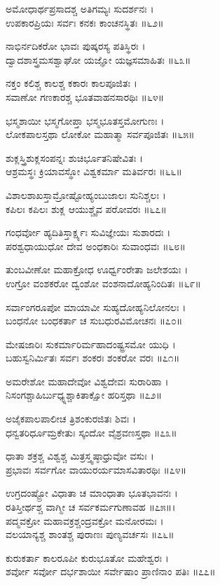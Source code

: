 ಅಮೋಧಾರ್ಥಪ್ರಸಾದಶ್ಚ ಅತಿಗಮ್ಯಃ ಸುದರ್ಶನಃ ।\\
ಉಪಕಾರಪ್ರಿಯಃ ಸರ್ವಃ ಕನಕಃ ಕಾಂಚನಸ್ಥಿತಃ ॥೬೨॥

ನಾಭಿರ್ನದಿಕರೋ ಭಾವಃ ಪುಷ್ಕರಸ್ಯ ಪತಿಸ್ಥಿರಃ ।\\
ದ್ವಾದಶಾಸ್ತ್ರಮಸಶ್ವಾಘೋ ಯಜ್ಞೋ ಯಜ್ಞಸಮಾಹಿತಃ ॥೬೩॥

ನಕ್ತಂ ಕಲಿಶ್ಚ ಕಾಲಶ್ಚ ಕಕಾರಃ ಕಾಲಪೂಜಿತಃ ।\\
ಸವಾಣೋ ಗಣಕಾರಶ್ಚ ಭೂತವಾಹನಸಾರಥಿಃ ॥೬೪॥

ಭಸ್ಮಶಾಯೀ ಭಸ್ಮಗೋಪ್ತಾ ಭಸ್ಮಭೂತಸ್ತಮೋಗುಣಃ ।\\
ಲೋಕಪಾಲಸ್ತಥಾ ಲೋಕೋ ಮಹಾತ್ಮಾ ಸರ್ವಪೂಜಿತಃ ॥೬೫॥

ಶುಕ್ಲಸ್ತ್ರಿಶುಕ್ಲಸಂಪನ್ನಃ ಶುಚಿರ್ಭೂತನಿಷೇವಿತಃ ।\\
ಆಶ್ರಮಸ್ಥಃ ಕ್ರಿಯಾವಸ್ಥೋ ವಿಶ್ವಕರ್ಮಾ ಮತಿರ್ವರಃ ॥೬೬॥

ವಿಶಾಲಶಾಖಸ್ತಾಮ್ರೋಷ್ಟೋಹ್ಯಂಬುಜಾಲಃ ಸುನಿಶ್ಚಲಃ ।\\
ಕಪಿಲಃ ಕಪಿಲಃ ಶುಕ್ಲ ಆಯುಶ್ಚೈವ ಪರೋವರಃ ॥೬೭॥

ಗಂಧರ್ವೋ ಹ್ಯದಿತಿಸ್ತಾರ್ಕ್ಷ್ಯಃ ಸುವಿಜ್ಞೇಯಃ ಸುಶಾರದಃ ।\\
ಪರಶ್ವಧಾಯುಧೋ ದೇವ ಅಂಧಕಾರಿಃ ಸುವಾಂಧವಃ ॥೬೮॥

ತುಂಬವೀಣೋ ಮಹಾಕ್ರೋಧ ಊರ್ಧ್ವಂರೇತಾ ಜಲೇಶಯಃ ।\\
ಉಗ್ರೋ ವಂಶಕರೋ ದ್ವಂಶೋ ವಂಶನಾದೋಹ್ಯನಿಂದಿತಃ ॥೬೯॥

ಸರ್ವಾಂಗರೂಪೋ ಮಾಯಾವೀ ಸುಹ್ಯದೋಹ್ಯನಿಲೋನಲಃ ।\\
ಬಂಧನೋ ಬಂಧಕರ್ತಾ ಚ ಸುಬಧುರವಿಮೋಚನಃ ॥೭೦॥

ಮೇಷಜಾರಿಃ ಸುಕರ್ಮಾರಿರ್ಮಹಾದಂಷ್ಟ್ರಸಮೋ ಯುಧಿ ।\\
ಬಹುಸ್ವನಿರ್ಮಿತಃ ಸರ್ವಃ ಶಂಕರಃ ಶಂಕರೋ ವರಃ ॥೭೧॥

ಅಮರೇಶೋ ಮಹಾದೇವೋ ವಿಶ್ವದೇವಃ ಸುರಾರಿಹಾ ।\\
ನಿಸಂಗಶ್ಚಾಹಿರ್ಬುಧ್ಯ್ನಶ್ಚಾಕಿತಾಕ್ಷೋ ಹರಿಸ್ತಥಾ ॥೭೨॥

ಅಜೈಕಪಾಲಪಾಲೀಚ ತ್ರಿಶಂಕುರಜಿತಃ ಶಿವಃ ।\\
ಧನ್ವತರಿರ್ಧೂಮ್ರಕೇತುಃ ಸ್ಕಂದೋ ವೈಶ್ರವಣಸ್ತಥಾ ॥೭೩॥

ಧಾತಾ ಶಕ್ರಶ್ಚ ವಿಶ್ವಶ್ಚ ಮಿತ್ರಸ್ತ್ವಷ್ಠಾಧ್ರುವೋ ವಸುಃ ।\\
ಪ್ರಭಾವಃ ಸರ್ವಗೋ ವಾಯುರರ್ಯಮಾಸವಿತಾರಥಿಃ ॥೭೪॥

ಉಗ್ರದಂಷ್ಟ್ರೋ ವಿಧಾತಾ ಚ ಮಾಂಧಾತಾ ಭೂತಭಾವನಃ ।\\
ರತಿಸ್ತೀರ್ಥಶ್ಚ ವಾಗ್ಮೀ ಚ ಸರ್ವಕರ್ಮಗುಣಾವಹ ॥೭೫॥।\\

ಪದ್ಮವಕ್ರೋ ಮಹಾವಕ್ರಶ್ಚಂದ್ರವಕ್ರೋ ಮನೋರಮಃ ।\\
ವಲಯಾನ್ಯಶ್ಚ ಶಾಂತಶ್ಚ ಪುರಾಣಃ ಪುಣ್ಯವರ್ಚಸಃ ॥೭೬॥

ಕುರುಕರ್ತಾ ಕಾಲರೂಪೀ ಕುರುಭೂತೋ ಮಹೇಶ್ವರಃ ।\\
ಶರ್ವೋ ಸರ್ವೋ ದರ್ಭಶಾಯೀ ಸರ್ವೇಷಾಂ ಪ್ರಾಣಿನಾಂ ಪತಿಃ ॥೭೭॥

